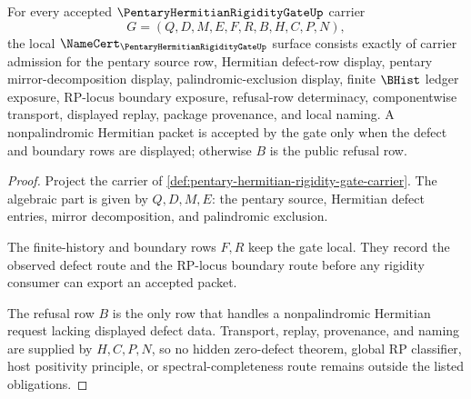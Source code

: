 \begin{theorem}
\label{thm:pentary-hermitian-rigidity-gate-namecert-obligations}
For every accepted $\PentaryHermitianRigidityGateUp$ carrier
$$
G=(Q,D,M,E,F,R,B,H,C,P,N),
$$
the local $\NameCert_{\PentaryHermitianRigidityGateUp}$ surface consists exactly of carrier admission for the pentary source row, Hermitian defect-row display, pentary mirror-decomposition display, palindromic-exclusion display, finite $\BHist$ ledger exposure, RP-locus boundary exposure, refusal-row determinacy, componentwise transport, displayed replay, package provenance, and local naming. A nonpalindromic Hermitian packet is accepted by the gate only when the defect and boundary rows are displayed; otherwise $B$ is the public refusal row.
\end{theorem}
\begin{proof}
Project the carrier of \autoref{def:pentary-hermitian-rigidity-gate-carrier}. The algebraic part is given by $Q,D,M,E$: the pentary source, Hermitian defect entries, mirror decomposition, and palindromic exclusion.

The finite-history and boundary rows $F,R$ keep the gate local. They record the observed defect route and the RP-locus boundary route before any rigidity consumer can export an accepted packet.

The refusal row $B$ is the only row that handles a nonpalindromic Hermitian request lacking displayed defect data. Transport, replay, provenance, and naming are supplied by $H,C,P,N$, so no hidden zero-defect theorem, global RP classifier, host positivity principle, or spectral-completeness route remains outside the listed obligations.
\end{proof}

